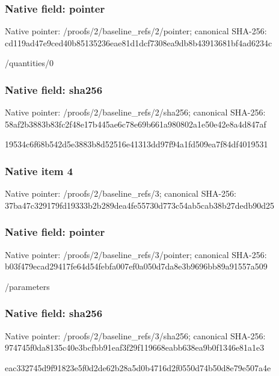 \documentclass[10pt,a4paper]{article}
\begin{document}
\subsubsection{Native field: pointer}
Native pointer: /proofs/2/baseline\_\allowbreak{}refs/2/pointer; canonical SHA-256: cd119ad47e9ced40b85135236eae81d1dcf7308ea9db8b43913681bf4ad6234c

\begingroup\raggedright\sloppy /\allowbreak{}quantities/\allowbreak{}0\par\endgroup

\subsubsection{Native field: sha256}
Native pointer: /proofs/2/baseline\_\allowbreak{}refs/2/sha256; canonical SHA-256: 58af2b3883b83fc2f48e17b445ae6c78e69b661a980802a1e50e42e8a4d847af

\begingroup\raggedright\sloppy 19534c6f68b542d5e3883b8d52516e41313dd97f94a1fd509ea7f84df4019531\par\endgroup

\subsubsection{Native item 4}
Native pointer: /proofs/2/baseline\_\allowbreak{}refs/3; canonical SHA-256: 37ba47c329179fd19333b2b289dea4fe55730d773c54ab5cab38b27dedb90d25

\subsubsection{Native field: pointer}
Native pointer: /proofs/2/baseline\_\allowbreak{}refs/3/pointer; canonical SHA-256: b03f479ecad29417fe64d54febfa007ef0a050d7da8e3b9696bb89a91557a509

\begingroup\raggedright\sloppy /\allowbreak{}parameters\par\endgroup

\subsubsection{Native field: sha256}
Native pointer: /proofs/2/baseline\_\allowbreak{}refs/3/sha256; canonical SHA-256: 974745f0da8135c40e3bcfbb91eaf3f29f119668eabb638ea9b0f1346e81a1e3

\begingroup\raggedright\sloppy eac332745d9f91823e5f0d2de62b28a5d0b4716d2f0550d74b50d8e79e507a4e\par\endgroup
\end{document}
